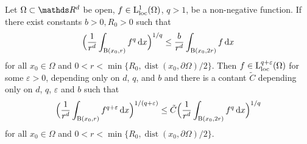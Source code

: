   \begin{prop}
    \label{prop:giaquinta}
    Let $\Omega \subset \R^d$ be open, $f \in \mathrm{L}^1_{\mathrm{loc}}(\Omega)$, $q > 1$, be a non-negative function.
    If there exist constants $b > 0, R_0 > 0$ such that
    \begin{align*}
      \Big( \frac{1}{r^d} \int_{\mathrm{B}(x_0, r)} f^q \, {\operatorname{d}\!{x}} \Big)^{1/q} \leq \frac{b}{r^d} \int_{\mathrm{B}(x_0, 2r)} f \, {\operatorname{d}\!{x}}
    \end{align*}
    for all $x_0 \in \Omega$ and $0 < r < \min\{ R_0, \operatorname{dist}(x_0, \partial\Omega)/2\}$.
    Then $f \in \mathrm{L}^{q + \varepsilon}_{\mathrm{loc}}(\Omega)$ for some $\varepsilon > 0$, depending only on $d$, $q$, and $b$ and there is a contant $\tilde C$ depending only on $d$, $q$, $\varepsilon$ and $b$ such that
    \begin{align*}
      \Big( \frac{1}{r^d} \int_{\mathrm{B}(x_0, r)} f^{q + \varepsilon} \, {\operatorname{d}\!{x}} \Big)^{1/(q + \varepsilon)} \leq \tilde C \Big( \frac{1}{r^d} \int_{\mathrm{B}(x_0, 2r)} f^q \, {\operatorname{d}\!{x}} \Big)^{1/q}
    \end{align*}
    for all $x_0 \in \Omega$ and $0 < r < \min\{R_0, \operatorname{dist}(x_0, \partial\Omega)/2\}$.
  \end{prop}

